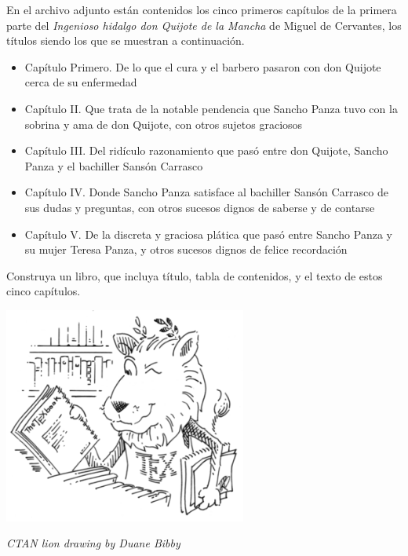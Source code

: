 \documentclass[12pt,letterpaper]{exam}
\begin{document}
\begin{questions}
\question[25] En el archivo adjunto están contenidos los cinco primeros capítulos de la primera parte del {\it Ingenioso hidalgo don Quijote de la Mancha} de Miguel de Cervantes, los títulos siendo los que se muestran a continuación.

	\begin{itemize}
		\item Capítulo Primero. De lo que el cura y el barbero pasaron con don Quijote cerca de su enfermedad
		\item Capítulo II. Que trata de la notable pendencia que Sancho Panza tuvo con la sobrina y ama de don Quijote, con otros sujetos graciosos
		\item Capítulo III. Del ridículo razonamiento que pasó entre don Quijote, Sancho Panza y el bachiller Sansón Carrasco
		\item Capítulo IV. Donde Sancho Panza satisface al bachiller Sansón Carrasco de sus dudas y preguntas, con otros sucesos dignos de saberse y de contarse
		\item Capítulo V. De la discreta y graciosa plática que pasó entre Sancho Panza y su mujer Teresa Panza, y otros sucesos dignos de felice recordación
	\end{itemize}

Construya un libro, que incluya título, tabla de contenidos, y el texto de estos cinco capítulos.

\vspace*{\fill}
\begin{center}
	\includegraphics[width=0.6\textwidth]{./ctan_lion.png}
	
	{\it CTAN lion drawing by Duane Bibby}
\end{center}
\vspace*{\fill}

\end{questions}
\end{document}
